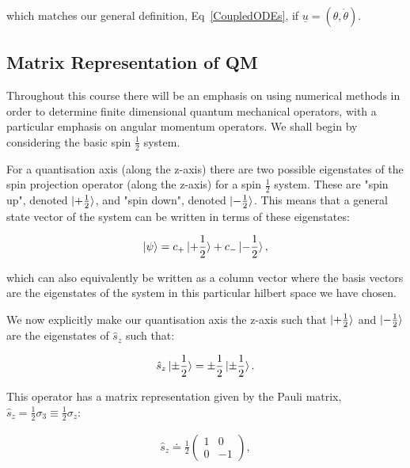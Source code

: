 \documentclass[11pt,a4paper]{article}
\begin{document}
\noindent which matches our general definition, Eq~\ref{CoupledODEs}, if $\underline{u} = (\theta, \dot{\theta})$.

\subsection{Matrix Representation of QM}

Throughout this course there will be an emphasis on using numerical methods in order to determine finite dimensional quantum mechanical operators, with a particular emphasis on angular momentum operators. We shall begin by considering the basic spin $\frac{1}{2}$ system.

\noindent For a quantisation axis (along the z-axis) there are two possible eigenstates of the spin projection operator (along the z-axis) for a spin $\frac{1}{2}$ system. These are "spin up", denoted $\ket{+ \frac{1}{2}}$, and "spin down", denoted $\ket{- \frac{1}{2}}$. This means that a general state vector of the system can be written in terms of these eigenstates:

\begin{equation}
    \ket{\psi} = c_+ \ket{+ \frac{1}{2}} + c_- \ket{- \frac{1}{2}},
    \label{GeneralSpin1/2SystemStatVector}
\end{equation}

\noindent which can also equivalently be written as a column vector where the basis vectors are the eigenstates of the system in this particular hilbert space we have chosen.

\noindent We now explicitly make our quantisation axis the z-axis such that $\ket{+ \frac{1}{2}}$ and $\ket{- \frac{1}{2}}$ are the eigenstates of $\hat{s}_z$ such that:

\begin{equation}
    \hat{s}_z \ket{\pm \frac{1}{2}} = \pm \frac{1}{2} \ket{\pm \frac{1}{2}}.
    \label{Spin1/2ProjectionEigenstates}
\end{equation}

\noindent This operator has a matrix representation given by the Pauli matrix, $\hat{s}_z = \frac{1}{2}\sigma_3 \equiv \frac{1}{2}\sigma_z$:

\begin{gather}
    \hat{s}_z \doteq \frac{1}{2}
    \begin{pmatrix}
         1 & 0 \\ 0 & -1
    \end{pmatrix}
    ,
    \label{MatrixRepresentationSz}
\end{gather}
\end{document}
